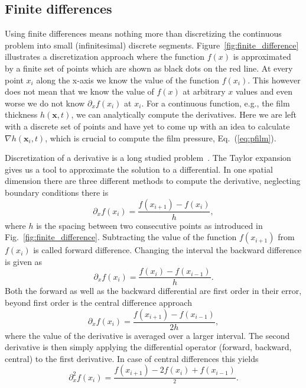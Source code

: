 \subsection{Finite differences}
Using finite differences means nothing more than discretizing the continuous problem into small (infinitesimal) discrete segments.
Figure~\ref{fig:finite_difference} illustrates a discretization approach where the function $f(x)$ is approximated by a finite set of points which are shown as black dots on the red line.
At every point $x_i$ along the x-axis we know the value of the function $f(x_i)$.
This however does not mean that we know the value of $f(x)$ at arbitrary $x$ values and even worse we do not know $\partial_x f(x_i)$ at $x_i$. 
For a continuous function, e.g., the film thickness $h(\mathbf{x},t)$, we can analytically compute the derivatives. 
Here we are left with a discrete set of points and have yet to come up with an idea to calculate $\nabla h(\mathbf{x}_i, t)$, which is crucial to compute the film pressure, Eq.~(\ref{eq:pfilm}).

Discretization of a derivative is a long studied problem~\cite{booleTreatiseCalculusFinite1872, jordanCalculusFiniteDifferences1965}.
The Taylor expansion gives us a tool to approximate the solution to a differential.
In one spatial dimension there are three different methods to compute the derivative, neglecting boundary conditions there is
\begin{equation}\label{eq:forward_dif}
    \partial_x f(x_i) = \frac{f(x_{i+1}) - f(x_i)}{h},
\end{equation}
where $h$ is the spacing between two consecutive points as introduced in Fig.~\ref{fig:finite_difference}. 
Subtracting the value of the function $f(x_{i+1})$ from $f(x_i)$ is called forward difference.
Changing the interval the backward difference is given as
\begin{equation}\label{eq:backward_dif}
    \partial_x f(x_i) = \frac{f(x_i) - f(x_{i-1})}{h}.
\end{equation}
Both the forward as well as the backward differential are first order in their error, beyond first order is the central difference approach
\begin{equation}\label{eq:center_diff}
    \partial_x f(x_i) = \frac{f(x_{i+1}) - f(x_{i-1})}{2h},
\end{equation}
where the value of the derivative is averaged over a larger interval. 
The second derivative is then simply applying the differential operator (forward, backward, central) to  the first derivative. 
In case of central differences this yields
\begin{equation}\label{eq:second_central_diff}
    \partial_x^2 f(x_i) = \frac{f(x_{i+1})-2f(x_i)+f(x_{i-1})}{^2}.
\end{equation}

